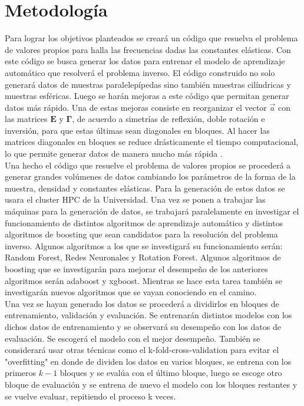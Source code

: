 \documentclass[12pt]{article}
\begin{document}
\section{Metodología}



Para lograr los objetivos planteados se creará un código que resuelva el problema de valores propios para halla las frecuencias dadas las constantes elásticas. Con este código se busca generar los datos para entrenar el modelo de aprendizaje automático que resolverá el problema inverso. El código construido  no solo generará datos de muestras paralelepípedas sino también muestras cilíndricas y muestras esféricas. Luego se harán mejoras a este código que permitan generar datos más rápido. Una de estas mejoras consiste en reorganizar el vector $\vec{a}$ con las matrices $\bm{E}$ y $\bm{\Gamma}$, de acuerdo a simetrías de reflexión, doble rotación e inversión, para que estas últimas sean diagonales en bloques. Al hacer las matrices diagonales en bloques se reduce drásticamente el tiempo computacional, lo que permite generar datos de manera mucho más rápida \cite{Leisure_1997}. 
\\
Una hecho el código que resuelve el problema de valores propios se procederá a generar grandes volúmenes de datos cambiando los parámetros de la forma de la muestra, densidad y constantes elásticas. Para la generación de estos datos se usara el cluster HPC de la Universidad. Una vez se ponen a trabajar las máquinas para la generación de datos, se trabajará paralelamente en investigar el funcionamiento de distintos algoritmos de aprendizaje automático y distintos algoritmos de boosting que sean candidatos para la resolución del problema inverso. Algunos algoritmos a los que se investigará su funcionamiento serán: Random Forest, Redes Neuronales y Rotation Forest. Algunos algoritmos de boosting que se investigarán para mejorar el desempeño de los anteriores algoritmos serán adaboost y xgboost. Mientras se hace esta tarea también se investigarán nuevos algoritmos que se vayan conociendo en el camino. 
\\
Una vez se hayan generado los datos se procederá a dividirlos en bloques de entrenamiento, validación y evaluación. Se entrenarán distintos modelos con los dichos datos de entrenamiento y se observará su desempeño con los datos de evaluación. Se escogerá el modelo con el mejor desempeño. También se considerará usar otras técnicas como el k-fold-cross-validation para evitar el "overfitting" en donde de dividen los datos en varios bloques, se entrena con los primeros $k-1$ bloques y se evalúa con el último bloque, luego se escoge otro bloque de evaluación y se entrena de nuevo el modelo con los bloques restantes y se vuelve evaluar, repitiendo el proceso k veces.  
\end{document}
